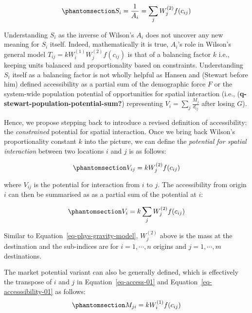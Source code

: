 \documentclass[
]{article}
\begin{document}
\begin{equation}\phantomsection\label{eq-Ai-as-accessibility}{
S_i = \frac{1}{A_i} = \sum_j W_j^{(2)} f(c_{ij})
}\end{equation}

Understanding \(S_i\) as the inverse of Wilson's \(A_i\) does not
uncover any new meaning for \(S_i\) itself. Indeed, mathematically it is
true, \(A_i\)'s role in Wilson's general model
\(T_{ij} = k W_i^{(1)} W_j^{(2)} f(c_{ij})\) is that of a balancing
factor \(k\) i.e., keeping units balanced and proportionality based on
constraints. Understanding \(S_i\) itself as a balancing factor is not
wholly helpful as Hansen and (Stewart before him) defined accessibility
as a partial sum of the demographic force \(F\) or the system-wide
population potential of opportunities for spatial interaction (i.e.,
(\textbf{q-stewart-population-potential-sum?}) representing
\(V_i = \sum_j \frac{M_j}{d_{ij}}\) after losing \(G\)).

Hence, we propose stepping back to introduce a revised definition of
accessibility: the \emph{constrained} potential for spatial interaction.
Once we bring back Wilson's proportionality constant \(k\) into the
picture, we can define the \emph{potential for spatial interaction}
between two locations \(i\) and \(j\) is as follows:

\begin{equation}\phantomsection\label{eq-access-01}{
V_{ij} = k W_j^{(2)} f(c_{ij})
}\end{equation}

\noindent where \(V_{ij}\) is the potential for interaction from \(i\)
to \(j\). The accessibility from origin \(i\) can then be summarised as
as a partial sum of the potential at \(i\):

\begin{equation}\phantomsection\label{eq-accesssibility-01}{
V_{i} = k \sum_j W_j^{(2)} f(c_{ij})
}\end{equation}

Similar to Equation~\ref{eq-phys-gravity-model}, \(W_j^{(2)}\) above is
the mass at the destination and the sub-indices are for
\(i = 1,\cdots, n\) origins and \(j = 1,\cdots, m\) destinations.

The market potential variant can also be generally defined, which is
effectively the transpose of \(i\) and \(j\) in
Equation~\ref{eq-access-01} and Equation~\ref{eq-accesssibility-01} as
follows: \begin{equation}\phantomsection\label{eq-market-01}{
M_{ji} = k W_i^{(1)} f(c_{ij})
}\end{equation}
\end{document}
